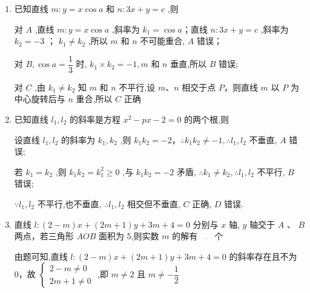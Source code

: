 \begin{enumerate}
\begin{jieda}
        综上,满足条件的 $k$ 的值共有 3 个.
    \end{jieda}

    \item 已知直线 $m : y = x\cos a$ 和 $n : {3x} + y = c$ ,则
    \begin{jieda}
        对 ${A}$ ,直线 $m : y = x\cos a$ ,斜率为 ${k}_{1} = \cos a$；直线 $n : {3x} + y = c$ ,斜率为 ${k}_{2} =  - 3$ ；
        ${k}_{1} \neq  {k}_{2}$ ,所以 $m$ 和 $n$ 不可能重合, ${A}$ 错误；
        
        对 ${B},\cos a = \dfrac{1}{3}$ 时, ${k}_{1} \times  {k}_{2} =  - 1,m$ 和 $n$ 垂直,所以 ${B}$ 错误;
        
        对 ${C}$ ,由 ${k}_{1} \neq  {k}_{2}$ 知 $m$ 和 $n$ 不平行,设 $m\text{、}n$ 相交于点 $P$，则直线 $m$ 以 $P$ 为中心旋转后与 $n$ 重合,所以 ${C}$ 正确
    \end{jieda}
    
    \item 已知直线 ${l}_{1},{l}_{2}$ 的斜率是方程 ${x}^{2} - {px} - 2 = 0$ 的两个根,则
    \begin{jieda}
        设直线 ${l}_{1},{l}_{2}$ 的斜率为 ${k}_{1},{k}_{2}$ ,则 ${k}_{1}{k}_{2} =  - 2$，$\therefore {k}_{1}{k}_{2} \neq   - 1,\therefore {l}_{1},{l}_{2}$ 不垂直, ${A}$ 错误;
        
        若 ${k}_{1} = {k}_{2}$ ,则 ${k}_{1}{k}_{2} = {k}_{1}^{2} \geq  0$ ,与 ${k}_{1}{k}_{2} =  - 2$ 矛盾, $\therefore {k}_{1} \neq  {k}_{2},\therefore {l}_{1},{l}_{2}$ 不平行, ${B}$ 错误;
        
        $\because {l}_{1},{l}_{2}$ 不平行,也不垂直, $\therefore {l}_{1},{l}_{2}$ 相交但不垂直, ${C}$ 正确, ${D}$ 错误.
    \end{jieda}
    
    \item 直线 $l : \left( {2 - m}\right) x + \left( {{2m} + 1}\right) y + {3m} + 4 = 0$ 分别与 $x$ 轴, $y$ 轴交于 $A\text{ 、 }B$ 两点，若三角形 ${AOB}$ 面积为 5,则实数 $m$ 的解有$\overline{\quad\quad}$个
    \begin{jieda}
        由题可知,直线 $l : \left( {2 - m}\right) x + \left( {{2m} + 1}\right) y + {3m} + 4 = 0$ 的斜率存在且不为 0，故 $\left\{  \begin{array}{l} 2 - m \neq  0 \\  {2m} + 1 \neq  0 \end{array}\right.$ ,即 $m \neq  2$ 且 $m \neq   - \dfrac{1}{2}$
        

\end{jieda}
\end{enumerate}
